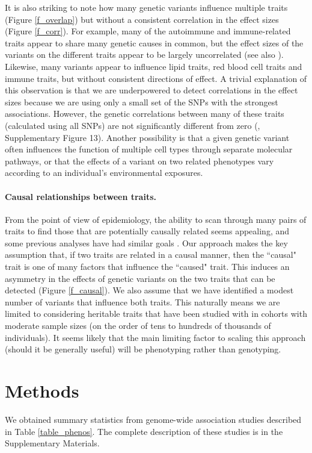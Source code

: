 \documentclass[11pt,titlepage]{article}
\begin{document}
It is also striking to note how many genetic variants influence multiple traits (Figure \ref{f_overlap}) but without a consistent correlation in the effect sizes (Figure \ref{f_corr}). For example, many of the autoimmune and immune-related traits appear to share many genetic causes in common, but the effect sizes of the variants on the different traits appear to be largely uncorrelated (see also \citet{Cotsapas:2011aa, bulik2015atlas}). Likewise, many variants appear to influence lipid traits, red blood cell traits and immune traits, but without consistent directions of effect. A trivial explanation of this observation is that we are underpowered to detect correlations in the effect sizes because we are using only a small set of the SNPs with the strongest associations. However, the genetic correlations between many of these traits (calculated using all SNPs) are not significantly different from zero (\citet{bulik2015atlas}, Supplementary Figure 13). Another possibility is that a given genetic variant often influences the function of multiple cell types through separate molecular pathways, or that the effects of a variant on two related phenotypes vary according to an individual's environmental exposures.

\paragraph{Causal relationships between traits.}
From the point of view of epidemiology, the ability to scan through many pairs of traits to find those that are potentially causally related seems appealing, and some previous analyses have had similar goals \citep{Evans:2013aa}. 
Our approach makes the key assumption that, if two traits are related in a causal manner, then the ``causal" trait is one of many factors that influence the ``caused" trait. 
This induces an asymmetry in the effects of genetic variants on the two traits that can be detected (Figure \ref{f_causal}). 
We also assume that we have identified a modest number of variants that influence both traits. 
This naturally means we are limited to considering heritable traits that have been studied with in cohorts with moderate sample sizes (on the order of tens to hundreds of thousands of individuals). 
It seems likely that the main limiting factor to scaling this approach (should it be generally useful) will be phenotyping rather than genotyping.

\section{Methods} \label{model_sec}
We obtained summary statistics from genome-wide association studies described in Table \ref{table_phenos}. The complete description of these studies is in the Supplementary Materials.
\end{document}
